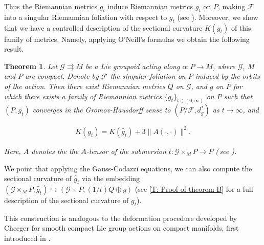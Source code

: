 \documentclass[12pt,a4paper,reqno]{amsart}
\newcommand{\1}{\mathbbm{1}} %
\newcommand{\fol}{\mathcal{F}} %
\newcommand{\G}{\mathcal{G}} %
\newtheorem{theorem}{Theorem}
\theoremstyle{definition}
\theoremstyle{TheoremNum}
\begin{document}
Thus the Riemannian metrics $\widehat{g}_t$ induce Riemannian metrics $g_t$ on $P$, making $\fol$ into a singular Riemannian foliation with respect to $g_t$ (see \cite{delHoyoFernandes2018}). Moreover, we show that we have a controlled description of the sectional curvature $K(g_t)$  of this family of metrics. Namely, applying O'Neill's formulas \cite{ONeill1966} we obtain the following result.

\begin{theorem}\th\label{MT: curvature of deformation}
Let $\G\rightrightarrows M$ be a Lie groupoid acting along $\alpha\colon P\to M$, where $\G$, $M$ and $P$ are compact. Denote by $\fol$ the singular foliation on $P$ induced by the orbits of the action. Then there exist Riemannian metrics $Q$ on $\G$, and $g$ on $P$ for which there exists a family of Riemannian metrics $\{g_t\}_{t\in (0,\infty)}$  on $P$ such that $(P,g_t)$ converges in the Gromov-Hausdorff sense to $(P/\fol,d_g^\ast)$ as $t\to \infty$, and 
\begin{linenomath}
\begin{align*}
K(g_t) = K(\widehat{g}_t)+3\|A(\cdot,\cdot)\|^2.
\end{align*}
\end{linenomath}
Here, $A$ denotes the the $A$-tensor of the submersion $\bar{t}\colon \G\times_M P\to P$ (\,see \cite{GromollWalschap}).
\end{theorem}

We point that applying the Gauss-Codazzi equations, we  can also compute the sectional curvature of $\widehat{g}_t$ via the embedding $(\G\times_M P,\widehat{g}_t)\hookrightarrow (\G\times P,(1/t)Q\oplus g)$  (see \th\ref{T: Proof of theorem B} for a full description of the sectional curvature of $g_t$).

This construction is analogous to the deformation procedure developed by Che\-eger for smooth compact Lie group actions on compact manifolds, first introduced in \cite{Cheeger1973}.
\end{document}
